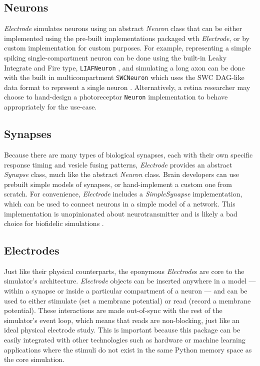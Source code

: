 \documentclass[letter, twocolumn]{article}
\begin{document}
\subsection{Neurons}
\textit{Electrode} simulates neurons using an abstract \textit{Neuron} class that can be either implemented using the pre-built implementations packaged wth \textit{Electrode}, or by custom implementation for custom purposes. For example, representing a simple spiking single-compartment neuron can be done using the built-in Leaky Integrate and Fire type, \texttt{LIAFNeuron} \cite{LIAF}, and simulating a long axon can be done with the built in multicompartment \texttt{SWCNeuron} which uses the SWC DAG-like data format to represent a single neuron \cite{SWC}. Alternatively, a retina researcher may choose to hand-design a photoreceptor \texttt{Neuron} implementation to behave appropriately for the use-case.

\subsection{Synapses}
Because there are many types of biological synapses, each with their own specific response timing and vesicle fusing patterns, \textit{Electrode} provides an abstract \textit{Synapse} class, much like the abstract \textit{Neuron} class. Brain developers can use prebuilt simple models of synapses, or hand-implement a custom one from scratch. For convenience, \textit{Electrode} includes a \textit{SimpleSynapse} implementation, which can be used to connect neurons in a simple model of a network. This implementation is unopinionated about neurotransmitter and is likely a bad choice for biofidelic simulations \cite{synweight}.

\subsection{Electrodes}
Just like their physical counterparts, the eponymous \textit{Electrode}s are core to the simulator's architecture. \textit{Electrode} objects can be inserted anywhere in a model --- within a synapse or inside a particular compartment of a neuron --- and can be used to either stimulate (set a membrane potential) or read (record a membrane potential). These interactions are made out-of-sync with the rest of the simulator's event loop, which means that reads are non-blocking, just like an ideal physical electrode study. This is important because this package can be easily integrated with other technologies such as hardware or machine learning applications where the stimuli do not exist in the same Python memory space as the core simulation.
\end{document}
